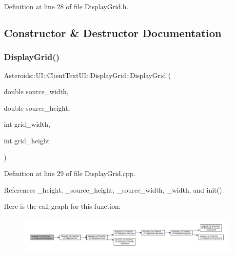 Definition at line 28 of file Display\+Grid.\+h.



\subsection{Constructor \& Destructor Documentation}
\mbox{\label{classAsteroids_1_1UI_1_1ClientTextUI_1_1DisplayGrid_a186316077596113cfd3cbb5d0be4922e}} 
\subsubsection{\texorpdfstring{Display\+Grid()}{DisplayGrid()}}
{\footnotesize\ttfamily Asteroids\+::\+U\+I\+::\+Client\+Text\+U\+I\+::\+Display\+Grid\+::\+Display\+Grid (\begin{DoxyParamCaption}\item[{double}]{source\+\_\+width,  }\item[{double}]{source\+\_\+height,  }\item[{int}]{grid\+\_\+width,  }\item[{int}]{grid\+\_\+height }\end{DoxyParamCaption})}



Definition at line 29 of file Display\+Grid.\+cpp.



References \+\_\+height, \+\_\+source\+\_\+height, \+\_\+source\+\_\+width, \+\_\+width, and init().

Here is the call graph for this function\+:\nopagebreak
\begin{figure}[H]
\begin{center}
\leavevmode
\includegraphics[width=350pt]{classAsteroids_1_1UI_1_1ClientTextUI_1_1DisplayGrid_a186316077596113cfd3cbb5d0be4922e_cgraph}
\end{center}
\end{figure}


